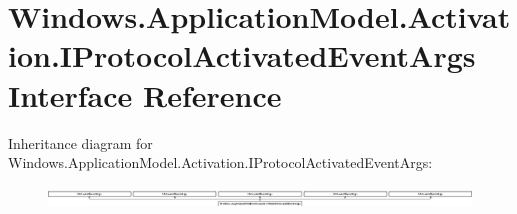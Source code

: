 \hypertarget{interface_windows_1_1_application_model_1_1_activation_1_1_i_protocol_activated_event_args}{}\section{Windows.\+Application\+Model.\+Activation.\+I\+Protocol\+Activated\+Event\+Args Interface Reference}
\label{interface_windows_1_1_application_model_1_1_activation_1_1_i_protocol_activated_event_args}
Inheritance diagram for Windows.\+Application\+Model.\+Activation.\+I\+Protocol\+Activated\+Event\+Args\+:\begin{figure}[H]
\begin{center}
\leavevmode
\includegraphics[height=0.562814cm]{interface_windows_1_1_application_model_1_1_activation_1_1_i_protocol_activated_event_args}
\end{center}
\end{figure}
